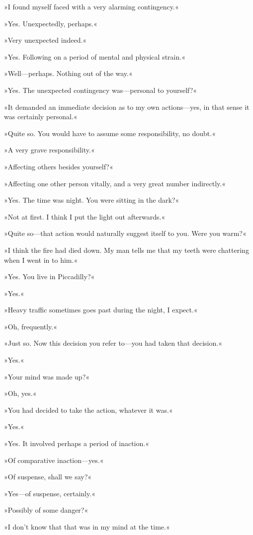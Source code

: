 »I found myself faced with a very alarming contingency.«

»Yes. Unexpectedly, perhaps.«

»Very unexpected indeed.«

»Yes. Following on a period of mental and physical strain.«

»Well—perhaps. Nothing out of the way.«

»Yes. The unexpected contingency was—personal to yourself?«

»It demanded an immediate decision as to my own actions—yes, in that sense it was certainly personal.«

»Quite so. You would have to assume some responsibility, no doubt.«

»A very grave responsibility.«

»Affecting others besides yourself?«

»Affecting one other person vitally, and a very great number indirectly.«

»Yes. The time was night. You were sitting in the dark?«

»Not at first. I think I put the light out afterwards.«

»Quite so—that action would naturally suggest itself to you. Were you warm?«

»I think the fire had died down. My man tells me that my teeth were chattering when I went in to him.«

»Yes. You live in Piccadilly?«

»Yes.«

»Heavy traffic sometimes goes past during the night, I expect.«

»Oh, frequently.«

»Just so. Now this decision you refer to—you had taken that decision.«

»Yes.«

»Your mind was made up?«

»Oh, yes.«

»You had decided to take the action, whatever it was.«

»Yes.«

»Yes. It involved perhaps a period of inaction.«

»Of comparative inaction—yes.«

»Of suspense, shall we say?«

»Yes—of suspense, certainly.«

»Possibly of some danger?«

»I don't know that that was in my mind at the time.«

